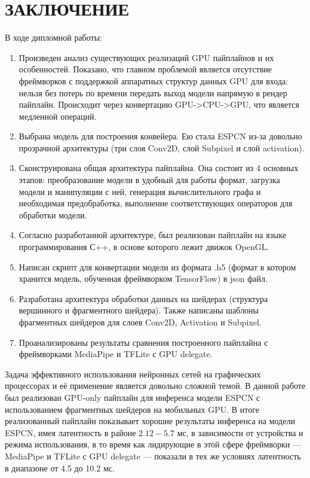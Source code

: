 \documentclass[a4paper,14pt]{extreport}
\begin{document}
    \chapter*{ЗАКЛЮЧЕНИЕ}
    В ходе дипломной работы:
    \begin{enumerate}
        \item Произведен анализ существующих реализаций GPU пайплайнов и их особенностей. Показано, что главном проблемой является отсутствие фреймворков с поддержкой аппаратных структур данных GPU для входа: нельзя без потерь по времени передать выход модели напрямую в рендер пайплайн. Происходит через конвертацию GPU->CPU->GPU, что является медленной операций.
        \item Выбрана модель для построения конвейера. Ею стала ESPCN из-за довольно прозрачной архитектуры (три слоя Conv2D, слой Subpixel и слой activation).
        \item Сконструирована общая архитектура пайплайна. Она состоит из 4 основных этапов: преобразование модели в удобный для работы формат, загрузка модели и манипуляции с ней, генерация вычислительного графа и необходимая предобработка, выполнение соответствующих операторов для обработки модели.
        \item Согласно разработанной архитектуре, был реализован пайплайн на языке программирования С++, в основе которого лежит движок OpenGL.
        \item Написан скрипт для конвертации модели из формата .h5 (формат в котором хранится модель, обученная фреймворком TensorFlow) в json файл.
        \item Разработана архитектура обработки данных на шейдерах (структура вершинного и фрагментного шейдера). Также написаны шаблоны фрагментных шейдеров для слоев Conv2D, Activation и Subpixel.
        \item Проанализированы результаты сравнения построенного пайплайна с фреймворками MediaPipe и TFLite с GPU delegate.
    \end{enumerate}

    Задача эффективного использования нейронных сетей на графических процессорах и её применение является довольно сложной темой. В данной работе был реализован GPU-only пайплайн для инференса модели ESPCN с использованием фрагментных шейдеров на мобильных GPU. В итоге реализованный пайплайн показывает хорошие результаты инференса на модели ESPCN, имея латентность в районе $2.12-5.7$ мс, в зависимости от устройства и режима использования, в то время как лидирующие в этой сфере фреймворки — MediaPipe и TFLite с GPU delegate — показали в тех же условиях латентность в диапазоне от 4.5 до 10.2 мс.
\end{document}
